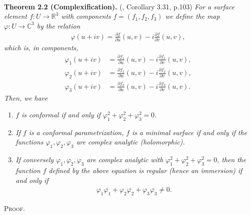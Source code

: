 \documentclass[a4paper]{article}
\numberwithin{equation}{section}
\begin{document}
\\
\textbf{Theorem 2.2 (Complexification).} (\cite{1}, Corollary 3.31, p.103) \textit{For a surface element $f:U\to \mathbb{R}^3$ with components $f=\left(f_1,f_2,f_3\right)$ we define the map $\varphi:U\to \mathbb{C}^3$ by the relation}
\begin{align}
\varphi \left( {u + iv} \right) = \frac{{\partial f}}{{\partial u}}\left( {u,v} \right) - i\frac{{\partial f}}{{\partial v}}\left( {u,v} \right),
\end{align}
\textit{which is, in components,}
\begin{align}
{\varphi _1}\left( {u + iv} \right) &= \frac{{\partial {f_1}}}{{\partial u}}\left( {u,v} \right) - i\frac{{\partial {f_1}}}{{\partial v}}\left( {u,v} \right),\\
{\varphi _2}\left( {u + iv} \right) &= \frac{{\partial {f_2}}}{{\partial u}}\left( {u,v} \right) - i\frac{{\partial {f_2}}}{{\partial v}}\left( {u,v} \right),\\
{\varphi _3}\left( {u + iv} \right) &= \frac{{\partial {f_3}}}{{\partial u}}\left( {u,v} \right) - i\frac{{\partial {f_3}}}{{\partial v}}\left( {u,v} \right).
\end{align}
\textit{Then, we have}
\begin{enumerate}
\item \textit{$f$ is conformal if and only if $\varphi _1^2 + \varphi _2^2 + \varphi _3^2 = 0$.}
\item \textit{If $f$ is a conformal parametrization, $f$ is a minimal surface if and only if the functions $\varphi _1,\varphi _2,\varphi _3$ are complex analytic (holomorphic).}
\item \textit{If conversely $\varphi _1,\varphi _2,\varphi _3$ are complex analytic with $\varphi _1^2 + \varphi _2^2 + \varphi _3^2 = 0$, then the function $f$ defined by the above equation is regular (hence an immersion) if and only if}
\begin{align}
{\varphi _1}\overline {{\varphi _1}}  + {\varphi _2}\overline {{\varphi _2}}  + {\varphi _3}\overline {{\varphi _3}}  \ne 0.
\end{align}
\end{enumerate}
\textsc{Proof.} 
\end{document}
